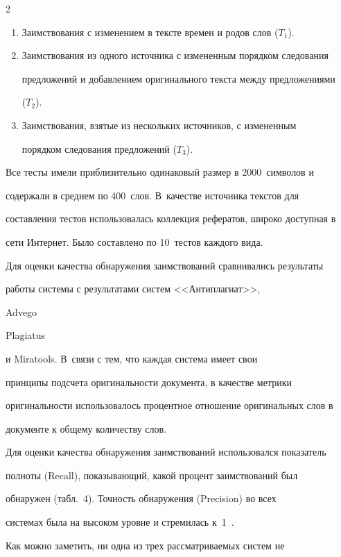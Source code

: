 \begin{multicols}{2}
\begin{enumerate}[1.]
\item Заимствования с изменением в тексте времен и родов слов ($T_1$).

\item Заимствования из одного источника с измененным порядком следования 

предложений и добавлением оригинального текста между предложениями 

($T_2$).

\item Заимствования, взятые из нескольких источников, с измененным 

порядком следования предложений ($T_3$).

\end{enumerate}



  Все тесты имели приблизительно одинаковый размер в 2000~символов и 

содержали в среднем по 400~слов. В~качестве источника текстов для 

составления тестов использовалась коллекция рефератов, широко доступная в 

сети Интернет. Было составлено по 10~тестов каждого вида. 

  

  Для оценки качества обнаружения заимствований сравнивались результаты 

работы сис\-те\-мы с результатами сис\-тем <<Антиплагиат>>, {Advego 

Plagiatus} и {Miratools}. В~связи с тем, что каждая сис\-те\-ма имеет свои 

принципы подсчета оригинальности документа, в качестве метрики 

оригинальности использовалось процентное отношение оригинальных слов в 

документе к общему количеству слов.

  

  Для оценки качества обнаружения заимствований использовался показатель 

полноты (Recall), показывающий, какой процент заимствований был 

обнаружен (табл.~4). Точность обнаружения (Precision) во всех 

сис\-те\-мах была на высоком уровне и стремилась к~1~\cite{15-sha}.







  Как можно заметить, ни одна из трех рас\-смат\-ри\-ва\-емых сис\-тем не 


\end{multicols}
